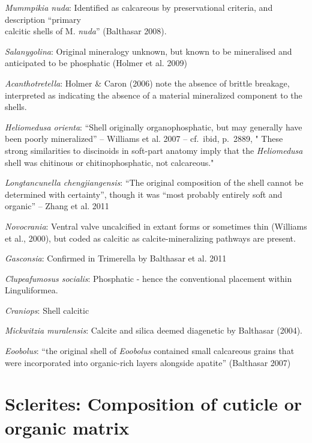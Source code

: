 \documentclass[]{book}
\theoremstyle{definition}
\theoremstyle{definition}
\theoremstyle{definition}
\theoremstyle{remark}
\begin{document}
\emph{Mummpikia nuda}: Identified as calcareous by preservational
criteria, and description ``primary\\
calcitic shells of M. \emph{nuda}'' (Balthasar 2008).

\emph{Salanygolina}: Original mineralogy unknown, but known to be
mineralised and anticipated to be phosphatic (Holmer et al. 2009)

\emph{Acanthotretella}: Holmer \& Caron (2006) note the absence of
brittle breakage, interpreted as indicating the absence of a material
mineralized component to the shells.

\emph{Heliomedusa orienta}: ``Shell originally organophosphatic, but may
generally have been poorly mineralized'' -- Williams et al. 2007 --
cf.~ibid, p.~2889, " These strong similarities to discinoids in
soft-part anatomy imply that the \emph{Heliomedusa} shell was chitinous
or chitinophosphatic, not calcareous."

\emph{Longtancunella chengjiangensis}: ``The original composition of the
shell cannot be determined with certainty'', though it was ``most
probably entirely soft and organic'' -- Zhang et al. 2011

\emph{Novocrania}: Ventral valve uncalcified in extant forms or
sometimes thin (Williams et al., 2000), but coded as calcitic as
calcite-mineralizing pathways are present.

\emph{Gasconsia}: Confirmed in Trimerella by Balthasar et al. 2011

\emph{Clupeafumosus socialis}: Phosphatic - hence the conventional
placement within Linguliformea.

\emph{Craniops}: Shell calcitic

\emph{Mickwitzia muralensis}: Calcite and silica deemed diagenetic by
Balthasar (2004).

\emph{Eoobolus}: ``the original shell of \emph{Eoobolus} contained small
calcareous grains that were incorporated into organic-rich layers
alongside apatite'' (Balthasar 2007)

\hypertarget{sclerites-composition-of-cuticle-or-organic-matrix}{%
\section*{Sclerites: Composition of cuticle or organic
matrix}\label{sclerites-composition-of-cuticle-or-organic-matrix}}
\end{document}
